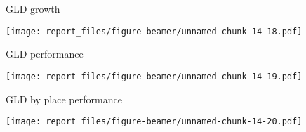 \documentclass[ignorenonframetext,]{beamer}
\begin{document}
\begin{frame}{GLD growth}
\protect\hypertarget{gld-growth}{}

\texttt{[image: report\_files/figure-beamer/unnamed-chunk-14-18.pdf]}

\end{frame}

\begin{frame}{GLD performance}
\protect\hypertarget{gld-performance}{}

\texttt{[image: report\_files/figure-beamer/unnamed-chunk-14-19.pdf]}

\end{frame}

\begin{frame}{GLD by place performance}
\protect\hypertarget{gld-by-place-performance}{}

\texttt{[image: report\_files/figure-beamer/unnamed-chunk-14-20.pdf]}

\end{frame}
\end{document}
